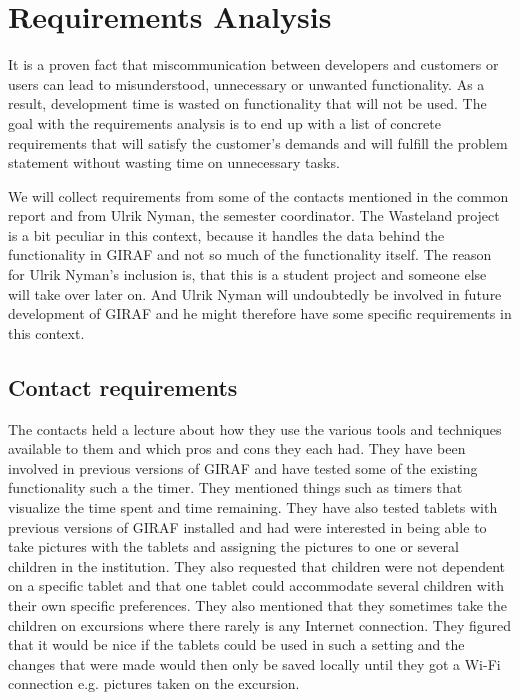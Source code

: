 \section{Requirements Analysis}
It is a proven fact that miscommunication between developers and customers or users can lead to misunderstood, unnecessary or unwanted functionality.\cite{req_wrong} %
As a result, development time is wasted on functionality that will not be used. The goal with the requirements analysis is to end up with a list of concrete requirements that will satisfy the customer's demands and will fulfill the problem statement without wasting time on unnecessary tasks. 

We will collect requirements from some of the contacts mentioned in the common report and from Ulrik Nyman, the semester coordinator. The Wasteland project is a bit peculiar in this context, because it handles the data behind the functionality in GIRAF and not so much of the functionality itself. The reason for Ulrik Nyman's inclusion is, that this is a student project and someone else will take over later on. And Ulrik Nyman will undoubtedly be involved in future development of GIRAF and he might therefore have some specific requirements in this context.

\subsection{Contact requirements}
The contacts held a lecture about how they use the various tools and techniques available to them and which pros and cons they each had. They have been involved in previous versions of GIRAF and have tested some of the existing functionality such a the timer. They mentioned things such as timers that visualize the time spent and time remaining. They have also tested tablets with previous versions of GIRAF installed and had were interested in being able to take pictures with the tablets and assigning the pictures to one or several children in the institution. They also requested that children were not dependent on a specific tablet and that one tablet could accommodate several children with their own specific preferences. They also mentioned that they sometimes take the children on excursions where there rarely is any Internet connection. They figured that it would be nice if the tablets could be used in such a setting and the changes that were made would then only be saved locally until they got a Wi-Fi connection e.g. pictures taken on the excursion.

